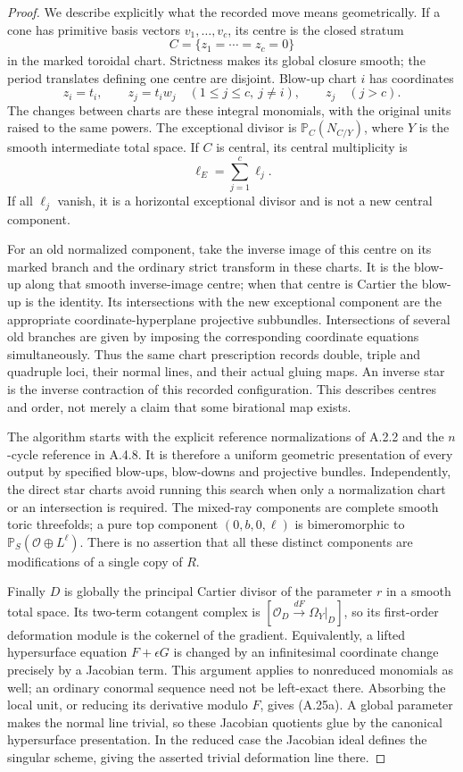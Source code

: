 \begin{proof}
We describe explicitly what the recorded move means
geometrically. If a cone has primitive basis vectors
$v_1,\ldots,v_c$, its centre is the closed stratum
\[
 C=\{z_1=\cdots=z_c=0\}
\]
in the marked toroidal chart. Strictness makes its
global closure smooth; the period translates defining
one centre are disjoint. Blow-up chart $i$ has
coordinates
\[
 z_i=t_i,\qquad z_j=t_i w_j\quad
 (1\leq j\leq c,\ j\ne i),
 \qquad z_j\quad(j>c).
\]
The changes between charts are these integral
monomials, with the original units raised to the
same powers. The exceptional divisor is
$\mathbb P_C(N_{C/Y})$, where $Y$ is the smooth
intermediate total space. If $C$ is central, its
central multiplicity is
\[
 \ell_E=\sum_{j=1}^c\ell_j.
\]
If all $\ell_j$ vanish, it is a horizontal exceptional
divisor and is not a new central component.

For an old normalized component, take the inverse
image of this centre on its marked branch and the
ordinary strict transform in these charts. It is
the blow-up along that smooth inverse-image centre;
when that centre is Cartier the blow-up is the
identity. Its intersections with the new exceptional
component are the appropriate coordinate-hyperplane
projective subbundles. Intersections of several old
branches are given by imposing the corresponding
coordinate equations simultaneously. Thus the same
chart prescription records double, triple and
quadruple loci, their normal lines, and their actual
gluing maps. An inverse star is the inverse
contraction of this recorded configuration. This
describes centres and order, not merely a claim that
some birational map exists.

The algorithm starts with the explicit reference
normalizations of A.2.2 and the $n$-cycle reference
in A.4.8. It is therefore a uniform geometric
presentation of every output by specified blow-ups,
blow-downs and projective bundles. Independently,
the direct star charts avoid running this search
when only a normalization chart or an intersection
is required. The mixed-ray components are complete
smooth toric threefolds; a pure top component
$(0,b,0,\ell)$ is bimeromorphic to
$\mathbb P_S(\mathcal O\oplus L^\ell)$.
There is no assertion that all these distinct
components are modifications of a single copy of $R$.

Finally $D$ is globally the principal Cartier
divisor of the parameter $r$ in a smooth total
space. Its two-term cotangent complex is
$[\mathcal O_D\xrightarrow{dF}\Omega_Y|_D]$,
so its first-order deformation module is the
cokernel of the gradient. Equivalently, a lifted
hypersurface equation $F+\epsilon G$ is changed by
an infinitesimal coordinate change precisely by a
Jacobian term. This argument applies to nonreduced
monomials as well; an ordinary conormal sequence
need not be left-exact there. Absorbing the local unit, or reducing its
derivative modulo $F$, gives (A.25a). A global
parameter makes the normal line trivial, so these
Jacobian quotients glue by the canonical
hypersurface presentation. In the reduced case
the Jacobian ideal defines the singular scheme,
giving the asserted trivial deformation line there.


\end{proof}
